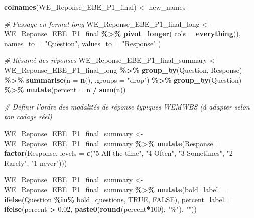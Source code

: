 \documentclass[
]{article}
\newenvironment{Shaded}{\begin{snugshade}}{\end{snugshade}}
\newcommand{\AttributeTok}[1]{\textcolor[rgb]{0.13,0.29,0.53}{#1}}
\newcommand{\CommentTok}[1]{\textcolor[rgb]{0.56,0.35,0.01}{\textit{#1}}}
\newcommand{\ConstantTok}[1]{\textcolor[rgb]{0.56,0.35,0.01}{#1}}
\newcommand{\DecValTok}[1]{\textcolor[rgb]{0.00,0.00,0.81}{#1}}
\newcommand{\FloatTok}[1]{\textcolor[rgb]{0.00,0.00,0.81}{#1}}
\newcommand{\FunctionTok}[1]{\textcolor[rgb]{0.13,0.29,0.53}{\textbf{#1}}}
\newcommand{\NormalTok}[1]{#1}
\newcommand{\OtherTok}[1]{\textcolor[rgb]{0.56,0.35,0.01}{#1}}
\newcommand{\SpecialCharTok}[1]{\textcolor[rgb]{0.81,0.36,0.00}{\textbf{#1}}}
\newcommand{\StringTok}[1]{\textcolor[rgb]{0.31,0.60,0.02}{#1}}
\begin{document}
\begin{Shaded}
\begin{Highlighting}[]
\FunctionTok{colnames}\NormalTok{(WE\_Reponse\_EBE\_P1\_final) }\OtherTok{\textless{}{-}}\NormalTok{ new\_names}

\CommentTok{\# Passage en format long}
\NormalTok{WE\_Reponse\_EBE\_P1\_final\_long }\OtherTok{\textless{}{-}}\NormalTok{ WE\_Reponse\_EBE\_P1\_final }\SpecialCharTok{\%\textgreater{}\%}
  \FunctionTok{pivot\_longer}\NormalTok{(}
    \AttributeTok{cols =} \FunctionTok{everything}\NormalTok{(),}
    \AttributeTok{names\_to =} \StringTok{"Question"}\NormalTok{,}
    \AttributeTok{values\_to =} \StringTok{"Response"}
\NormalTok{  )}

\CommentTok{\# Résumé des réponses}
\NormalTok{WE\_Reponse\_EBE\_P1\_final\_summary }\OtherTok{\textless{}{-}}\NormalTok{ WE\_Reponse\_EBE\_P1\_final\_long }\SpecialCharTok{\%\textgreater{}\%}
  \FunctionTok{group\_by}\NormalTok{(Question, Response) }\SpecialCharTok{\%\textgreater{}\%}
  \FunctionTok{summarise}\NormalTok{(}\AttributeTok{n =} \FunctionTok{n}\NormalTok{(), }\AttributeTok{.groups =} \StringTok{"drop"}\NormalTok{) }\SpecialCharTok{\%\textgreater{}\%}
  \FunctionTok{group\_by}\NormalTok{(Question) }\SpecialCharTok{\%\textgreater{}\%}
  \FunctionTok{mutate}\NormalTok{(}\AttributeTok{percent =}\NormalTok{ n }\SpecialCharTok{/} \FunctionTok{sum}\NormalTok{(n))}


\CommentTok{\# Définir l’ordre des modalités de réponse typiques WEMWBS (à adapter selon ton codage réel)}


\NormalTok{WE\_Reponse\_EBE\_P1\_final\_summary }\OtherTok{\textless{}{-}}\NormalTok{ WE\_Reponse\_EBE\_P1\_final\_summary }\SpecialCharTok{\%\textgreater{}\%}
  \FunctionTok{mutate}\NormalTok{(}\AttributeTok{Response =} \FunctionTok{factor}\NormalTok{(Response,}
                           \AttributeTok{levels =} \FunctionTok{c}\NormalTok{(}\StringTok{"5 All the time"}\NormalTok{, }\StringTok{"4 Often"}\NormalTok{, }\StringTok{"3 Sometimes"}\NormalTok{, }\StringTok{"2 Rarely"}\NormalTok{, }\StringTok{"1 never"}\NormalTok{)))}


\NormalTok{WE\_Reponse\_EBE\_P1\_final\_summary }\OtherTok{\textless{}{-}}\NormalTok{ WE\_Reponse\_EBE\_P1\_final\_summary }\SpecialCharTok{\%\textgreater{}\%}
  \FunctionTok{mutate}\NormalTok{(}\AttributeTok{bold\_label =} \FunctionTok{ifelse}\NormalTok{(Question }\SpecialCharTok{\%in\%}\NormalTok{ bold\_questions, }\ConstantTok{TRUE}\NormalTok{, }\ConstantTok{FALSE}\NormalTok{),}
         \AttributeTok{percent\_label =} \FunctionTok{ifelse}\NormalTok{(percent }\SpecialCharTok{\textgreater{}} \FloatTok{0.02}\NormalTok{, }\FunctionTok{paste0}\NormalTok{(}\FunctionTok{round}\NormalTok{(percent}\SpecialCharTok{*}\DecValTok{100}\NormalTok{), }\StringTok{"\%"}\NormalTok{), }\StringTok{""}\NormalTok{))}


\end{Highlighting}
\end{Shaded}
\end{document}
